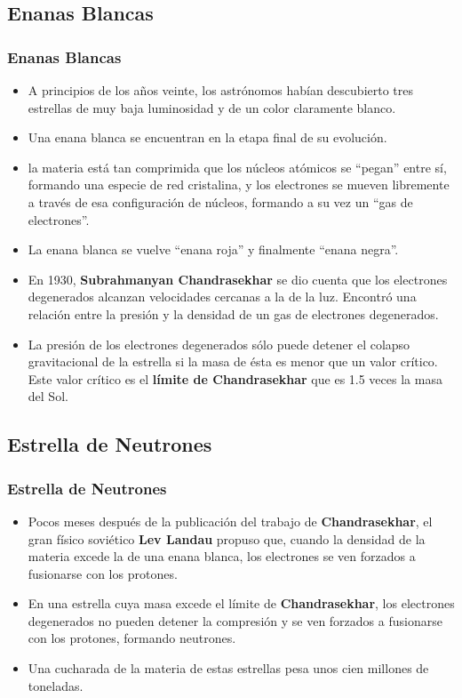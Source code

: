 \documentclass{beamer}
\begin{document}
\subsection[Enanas Blancas]{Enanas Blancas}
\begin{frame}
 \frametitle{Enanas Blancas}
 \begin{itemize}
  \item A principios de los años veinte, los astrónomos habían descubierto tres estrellas de muy baja luminosidad y de un color claramente blanco.
  \item Una enana blanca se encuentran en la etapa final de su evolución.
  \item la materia está tan comprimida que los núcleos atómicos se ``pegan'' entre sí, formando una especie de red cristalina, y los electrones se mueven libremente a través de esa configuración de núcleos, formando a su vez un ``gas de electrones''.
  \item La enana blanca se vuelve ``enana roja'' y finalmente ``enana negra''.
 \end{itemize}
\end{frame}
\begin{frame}
 \begin{itemize}
  \item En 1930, \textbf{Subrahmanyan Chandrasekhar} se dio cuenta que los electrones degenerados alcanzan velocidades cercanas a la de la luz. Encontró una relación entre la presión y la densidad de un gas de electrones degenerados.
  \item La presión de los electrones degenerados sólo puede detener el colapso gravitacional de la estrella si la masa de ésta es menor que un valor crítico. Este valor crítico es el \textbf{límite de Chandrasekhar} que es 1.5 veces la masa del Sol.
 \end{itemize}
\end{frame}

\subsection[Estrella de Neutrones]{Estrella de Neutrones}
\begin{frame}
 \frametitle{Estrella de Neutrones}
 \begin{itemize}
  \item Pocos meses después de la publicación del trabajo de \textbf{Chandrasekhar}, el gran físico soviético \textbf{Lev Landau} propuso que, cuando la densidad de la materia excede la de una enana blanca, los electrones se ven forzados a fusionarse con los protones.
  \item En una estrella cuya masa excede el límite de \textbf{Chandrasekhar}, los electrones degenerados no pueden detener la compresión y se ven forzados a fusionarse con los protones, formando neutrones.
  \item Una cucharada de la materia de estas estrellas pesa unos cien millones de toneladas.
 \end{itemize}
\end{frame}
\end{document}

